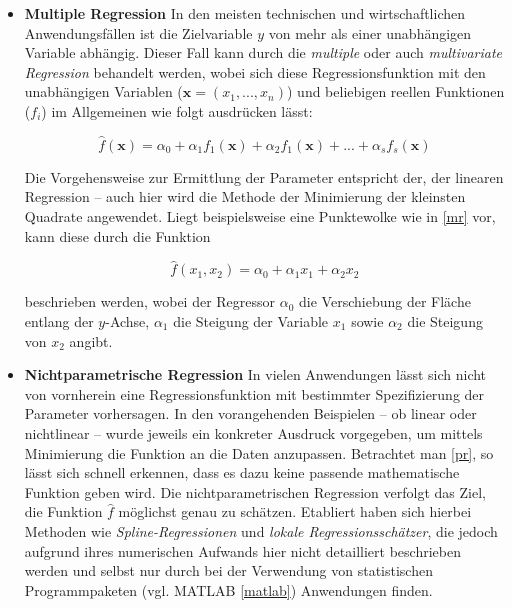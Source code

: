 \begin{itemize}




\item \textbf{Multiple Regression}\enlargethispage{2\baselineskip} 
In den meisten technischen und wirtschaftlichen Anwendungsfällen ist die Zielvariable $y$ von mehr als einer unabhängigen Variable abhängig. Dieser Fall kann durch die \textit{multiple} oder auch \textit{multivariate Regression} behandelt werden, wobei sich diese Regressionsfunktion mit den unabhängigen Variablen ($\boldsymbol{x} = (x_1,...,x_n)$) und beliebigen reellen Funktionen ($f_i$) im Allgemeinen wie folgt ausdrücken lässt:

\begin{equation}
	\hat{f}(\boldsymbol{x}) = \alpha_0 + \alpha_1 f_1(\boldsymbol{x}) + \alpha_2 f_1(\boldsymbol{x}) + ... + \alpha_s f_s(\boldsymbol{x}) 
\end{equation}

Die Vorgehensweise zur Ermittlung der Parameter entspricht der, der linearen Regression -- auch hier wird die Methode der Minimierung der kleinsten Quadrate angewendet. Liegt beispielsweise eine Punktewolke wie in \vref{mr} vor, kann diese durch die Funktion

\begin{equation}
	\hat{f}(x_1,x_2) = \alpha_0 + \alpha_1 x_1 + \alpha_2 x_2
\end{equation}

beschrieben werden, wobei der Regressor $\alpha_0$ die Verschiebung der Fläche entlang der $y$-Achse, $\alpha_1$ die Steigung der Variable $x_1$ sowie $\alpha_2$ die Steigung von $x_2$ angibt. 




\item \textbf{Nichtparametrische Regression}
In vielen Anwendungen lässt sich nicht von vornherein eine Regressionsfunktion mit bestimmter Spezifizierung der Parameter vorhersagen. In den vorangehenden Beispielen -- ob linear oder nichtlinear -- wurde jeweils ein konkreter Ausdruck vorgegeben, um mittels Minimierung die Funktion an die Daten anzupassen. Betrachtet man \vref{pr}, so lässt sich schnell erkennen, dass es dazu keine passende mathematische Funktion geben wird. Die nichtparametrischen Regression verfolgt das Ziel, die Funktion $\hat{f}$ möglichst genau zu schätzen. Etabliert haben sich hierbei Methoden wie \textit{Spline-Regressionen} und \textit{lokale Regressionsschätzer}, die jedoch aufgrund ihres numerischen Aufwands hier nicht detailliert beschrieben werden und selbst nur durch bei der Verwendung von statistischen Programmpaketen (vgl. MATLAB \vref{matlab}) Anwendungen finden.


\end{itemize}
